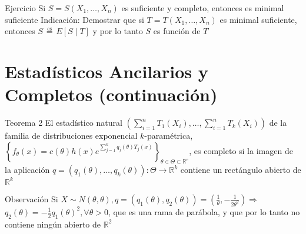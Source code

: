  
Ejercicio Si $S=S\left(X_{1}, \ldots, X_{n}\right)$ es suficiente y completo, entonces es minimal suficiente Indicación: Demostrar que si $T=T\left(X_{1}, \ldots, X_{n}\right)$ es minimal suficiente, entonces $S \stackrel{\text { cs }}{=} E[S \mid T]$ y por lo tanto $S$ es función de $T$
  
\section*{Estadísticos Ancilarios y Completos (continuación)}
Teorema 2 El estadístico natural $\left(\sum_{i=1}^{n} T_{1}\left(X_{i}\right), \ldots, \sum_{i=1}^{n} T_{k}\left(X_{i}\right)\right)$ de la familia de distribuciones exponencial $k$-paramétrica, $\left\{f_{\theta}(x)=c(\theta) h(x) e^{\sum_{j=1}^{k} q_{j}(\theta) T_{j}(x)}\right\}_{\theta \in \Theta \subset \mathbb{R}^{e}}$, es completo si la imagen de la aplicación $q=\left(q_{1}(\theta), \ldots, q_{k}(\theta)\right): \Theta \longrightarrow \mathbb{R}^{k}$ contiene un rectángulo abierto de $\mathbb{R}^{k}$
  
Observación Si $X \sim N(\theta, \theta), q=\left(q_{1}(\theta), q_{2}(\theta)\right)=\left(\frac{1}{\theta},-\frac{1}{2 \theta^{2}}\right) \Rightarrow$ $q_{2}(\theta)=-\frac{1}{2} q_{1}(\theta)^{2}, \forall \theta>0$, que es una rama de parábola, y que por lo tanto no contiene ningún abierto de $\mathbb{R}^{2}$
  
